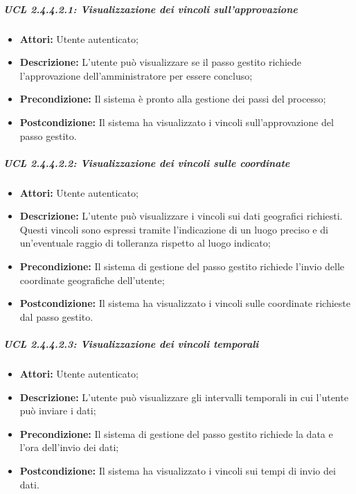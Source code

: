 \subparagraph{UCL 2.4.4.2.1: Visualizzazione dei vincoli sull'approvazione}
\begin{itemize}
\item \textbf{Attori:} Utente autenticato;
\item \textbf{Descrizione:} L'utente può visualizzare se il passo gestito richiede l'approvazione dell'amministratore per essere concluso;
\item \textbf{Precondizione:} Il sistema è pronto alla gestione dei passi del processo;
\item \textbf{Postcondizione:} Il sistema ha visualizzato i vincoli sull'approvazione del passo gestito.
\end{itemize}

\subparagraph{UCL 2.4.4.2.2: Visualizzazione dei vincoli sulle coordinate}
\begin{itemize}
\item \textbf{Attori:} Utente autenticato;
\item \textbf{Descrizione:} L'utente può visualizzare i vincoli sui dati geografici richiesti. Questi vincoli sono espressi tramite l'indicazione di un luogo preciso e di un'eventuale raggio di tolleranza rispetto al luogo indicato;
\item \textbf{Precondizione:} Il sistema di gestione del passo gestito richiede l'invio delle coordinate geografiche dell'utente;
\item \textbf{Postcondizione:} Il sistema ha visualizzato i vincoli sulle coordinate richieste dal passo gestito.
\end{itemize}

\subparagraph{UCL 2.4.4.2.3: Visualizzazione dei vincoli temporali}
\begin{itemize}
\item \textbf{Attori:} Utente autenticato;
\item \textbf{Descrizione:} L'utente può visualizzare gli intervalli temporali in cui l'utente può inviare i dati;
\item \textbf{Precondizione:} Il sistema di gestione del passo gestito richiede la data e l'ora dell'invio dei dati;
\item \textbf{Postcondizione:} Il sistema ha visualizzato i vincoli sui tempi di invio dei dati.
\end{itemize}

